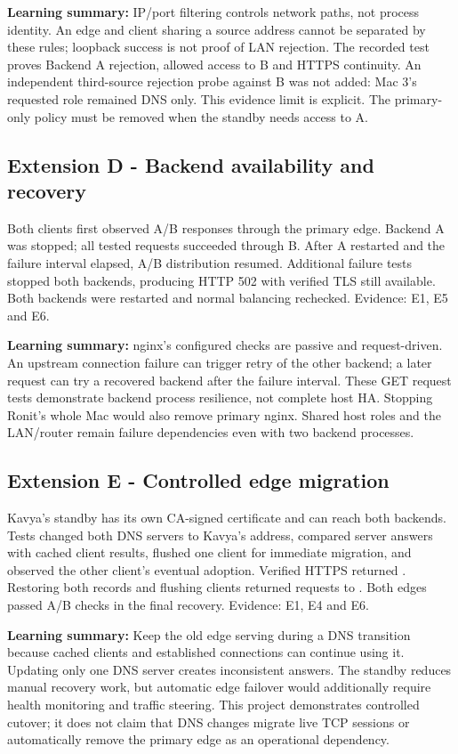 \documentclass[12pt,a4paper]{article}
\newcommand{\codepath}[1]{\path{#1}}
\begin{document}
\textbf{Learning summary:} IP/port filtering controls network paths, not process identity. An edge and client sharing a source address cannot be separated by these rules; loopback success is not proof of LAN rejection. The recorded test proves Backend A rejection, allowed access to B and HTTPS continuity. An independent third-source rejection probe against B was not added: Mac 3's requested role remained DNS only. This evidence limit is explicit. The primary-only policy must be removed when the standby needs access to A.


\subsection{Extension D - Backend availability and recovery}


Both clients first observed A/B responses through the primary edge. Backend A was stopped; all tested requests succeeded through B. After A restarted and the failure interval elapsed, A/B distribution resumed. Additional failure tests stopped both backends, producing HTTP 502 with verified TLS still available. Both backends were restarted and normal balancing rechecked. Evidence: E1, E5 and E6.


\textbf{Learning summary:} nginx's configured checks are passive and request-driven. An upstream connection failure can trigger retry of the other backend; a later request can try a recovered backend after the failure interval. These GET request tests demonstrate backend process resilience, not complete host HA. Stopping Ronit's whole Mac would also remove primary nginx. Shared host roles and the LAN/router remain failure dependencies even with two backend processes.


\subsection{Extension E - Controlled edge migration}


Kavya's standby has its own CA-signed certificate and can reach both backends. Tests changed both DNS servers to Kavya's address, compared server answers with cached client results, flushed one client for immediate migration, and observed the other client's eventual adoption. Verified HTTPS returned \codepath{X-Edge: mac1}. Restoring both records and flushing clients returned requests to \codepath{mac2}. Both edges passed A/B checks in the final recovery. Evidence: E1, E4 and E6.


\textbf{Learning summary:} Keep the old edge serving during a DNS transition because cached clients and established connections can continue using it. Updating only one DNS server creates inconsistent answers. The standby reduces manual recovery work, but automatic edge failover would additionally require health monitoring and traffic steering. This project demonstrates controlled cutover; it does not claim that DNS changes migrate live TCP sessions or automatically remove the primary edge as an operational dependency.
\end{document}
